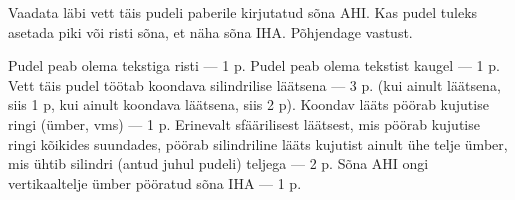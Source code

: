 
Vaadata läbi vett täis pudeli paberile kirjutatud sõna AHI. Kas pudel tuleks asetada piki või risti sõna, et näha sõna IHA. Põhjendage vastust.

\hint

\solu
Pudel peab olema tekstiga risti --- 1 p. Pudel peab olema tekstist kaugel --- 1 p. Vett täis pudel töötab koondava silindrilise läätsena --- 3 p. (kui ainult läätsena, siis 1 p, kui ainult koondava läätsena, siis 2 p). Koondav lääts pöörab kujutise ringi (ümber, vms) --- 1 p. Erinevalt sfäärilisest läätsest, mis pöörab kujutise ringi kõikides suundades, pöörab silindriline lääts kujutist ainult ühe telje ümber, mis ühtib silindri (antud juhul pudeli) teljega --- 2 p. Sõna AHI ongi vertikaaltelje ümber pööratud sõna IHA --- 1 p.
\probend
